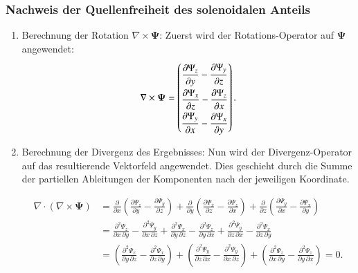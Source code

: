 \subsubsection{Nachweis der Quellenfreiheit des solenoidalen Anteils}

\begin{enumerate}
    \item Berechnung der Rotation $\nabla \times \boldsymbol{\Psi}$:
	Zuerst wird der Rotations-Operator auf $\boldsymbol{\Psi}$ angewendet:
    \[
    \nabla \times \boldsymbol{\Psi} =
	\renewcommand{\arraystretch}{2.0}
    \begin{pmatrix}
        \displaystyle\frac{\partial \Psi_z}{\partial y} - \frac{\partial \Psi_y}{\partial z} \\
        \displaystyle\frac{\partial \Psi_x}{\partial z} - \frac{\partial \Psi_z}{\partial x} \\
        \displaystyle\frac{\partial \Psi_y}{\partial x} - \frac{\partial \Psi_x}{\partial y}
    \end{pmatrix}.
    \]

    \item Berechnung der Divergenz des Ergebnisses: Nun wird der Divergenz-Operator auf das resultierende Vektorfeld angewendet. Dies geschieht durch die Summe der partiellen Ableitungen der Komponenten nach der jeweiligen Koordinate.
    
    \begin{align*}
    \nabla \cdot (\nabla \times \boldsymbol{\Psi}) &= \frac{\partial}{\partial x}\left( \frac{\partial \Psi_z}{\partial y} - \frac{\partial \Psi_y}{\partial z} \right) + \frac{\partial}{\partial y}\left( \frac{\partial \Psi_x}{\partial z} - \frac{\partial \Psi_z}{\partial x} \right) + \frac{\partial}{\partial z}\left( \frac{\partial \Psi_y}{\partial x} - \frac{\partial \Psi_x}{\partial y} \right) \\
    &= \frac{\partial^2 \Psi_z}{\partial x\, \partial y} - \frac{\partial^2 \Psi_y}{\partial x\, \partial z} + \frac{\partial^2 \Psi_x}{\partial y\, \partial z} - \frac{\partial^2 \Psi_z}{\partial y\, \partial x} + \frac{\partial^2 \Psi_y}{\partial z\, \partial x} - \frac{\partial^2 \Psi_x}{\partial z\, \partial y} \\
    &= \left( \frac{\partial^2 \Psi_x}{\partial y\, \partial z} - \frac{\partial^2 \Psi_x}{\partial z\, \partial y} \right) + \left( \frac{\partial^2 \Psi_y}{\partial z\, \partial x} - \frac{\partial^2 \Psi_y}{\partial x\, \partial z} \right) + \left( \frac{\partial^2 \Psi_z}{\partial x\, \partial y} - \frac{\partial^2 \Psi_z}{\partial y\, \partial x} \right) = 0.
    \end{align*}
    

\end{enumerate}
